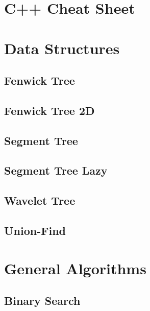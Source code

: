\documentclass[10pt,landscape,twocolumn,a4paper,notitlepage]{article}
\begin{document}
\def\title{Pablo Messina's ICPC Notebook}
\tableofcontents\newpage


\section{C++ Cheat Sheet}



\section{Data Structures}
  \subsection{Fenwick Tree}
  

  \subsection{Fenwick Tree 2D}
  

  \subsection{Segment Tree}
  

  \subsection{Segment Tree Lazy}
  

  \subsection{Wavelet Tree}
  

  \subsection{Union-Find}
  

\section{General Algorithms}
  \subsection{Binary Search}
  
\end{document}
